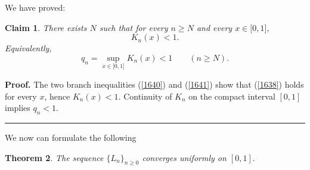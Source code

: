 \documentclass[onecolumn]{article}
\newtheorem{theorem}{Theorem}
\newtheorem{claim}[theorem]{Claim}
\newenvironment{proof}[1][Proof]{\noindent\textbf{#1.} }{\ \rule{0.5em}{0.5em}}
\begin{document}
We have proved:

\begin{claim}
\label{pointwise-Kn} There exists $N$ such that for every $n\geq N$ and
every $x\in \lbrack 0,1]$, 
\begin{equation}
K_{n}(x)<1.  \label{1684}
\end{equation}%
Equivalently, 
\begin{equation}
q_{n}=\sup_{x\in \lbrack 0,1]}K_{n}(x)<1\qquad (n\geq N).  \label{1685}
\end{equation}
\end{claim}

\begin{proof}
\noindent The two branch inequalities (\ref{1640}) and (\ref{1641}) show
that (\ref{1638}) holds for every $x$, hence $K_{n}(x)<1$. Continuity of $%
K_{n}$ on the compact interval $[0,1]$ implies $q_{n}<1$.
\end{proof}

We now can formulate the following

\begin{theorem}
The sequence $\{L_{n}\}_{n\geq 0}$ converges uniformly on $[0,1].$
\end{theorem}
\end{document}
